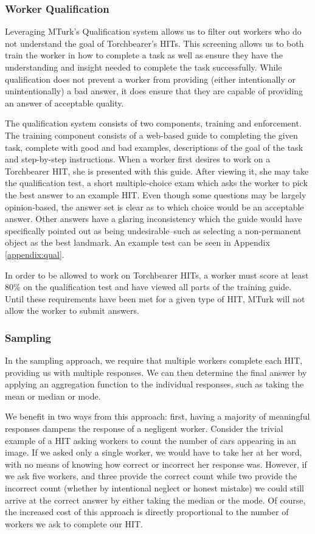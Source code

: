 \subsubsection{Worker Qualification}

Leveraging MTurk's Qualification system allows us to filter out workers who do not understand the goal of Torchbearer's HITs. This screening allows us to both train the worker in how to complete a task as well as ensure they have the understanding and insight needed to complete the task successfully. While qualification does not prevent a worker from providing (either intentionally or unintentionally) a bad answer, it does ensure that they are capable of providing an answer of acceptable quality.

The qualification system consists of two components, training and enforcement. The training component consists of a web-based guide to completing the given task, complete with good and bad examples, descriptions of the goal of the task and step-by-step instructions. When a worker first desires to work on a Torchbearer HIT, she is presented with this guide. After viewing it, she may take the qualification test, a short multiple-choice exam which asks the worker to pick the best answer to an example HIT. Even though some questions may be largely opinion-based, the answer set is clear as to which choice would be an acceptable answer. Other answers have a glaring inconsistency which the guide would have specifically pointed out as being undesirable--such as selecting a non-permanent object as the best landmark. An example test can be seen in Appendix \ref{appendix:qual}.

In order to be allowed to work on Torchbearer HITs, a worker must score at least 80\% on the qualification test and have viewed all parts of the training guide. Until these requirements have been met for a given type of HIT, MTurk will not allow the worker to submit answers. 

\subsubsection{Sampling}

In the sampling approach, we require that multiple workers complete each HIT, providing us with multiple responses. We can then determine the final answer by applying an aggregation function to the individual responses, such as taking the mean or median or mode. 

We benefit in two ways from this approach: first, having a majority of meaningful responses dampens the response of a negligent worker. Consider the trivial example of a HIT asking workers to count the number of cars appearing in an image. If we asked only a single worker, we would have to take her at her word, with no means of knowing how correct or incorrect her response was. However, if we ask five workers, and three provide the correct count while two provide the incorrect count (whether by intentional neglect or honest mistake) we could still arrive at the correct answer by either taking the median or the mode. Of course, the increased cost of this approach is directly proportional to the number of workers we ask to complete our HIT.


